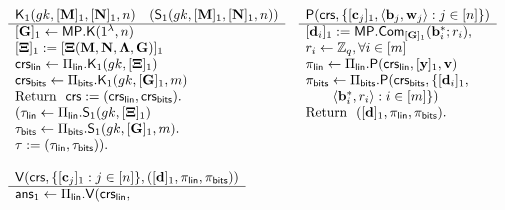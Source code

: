 \begin{figure}
\begin{\algSize}
$$
\begin{array}{ll}
\begin{array}{l}
\algK_1(\gk,[\matr{M}]_1,[\matr{N}]_1,n)
\quad (\mathsf{S}_1(\gk,[\matr{M}]_1,[\matr{N}]_1,n))
\\
\hline
[\matr{G}]_1 \gets \MP.\algK(1^\lambda,n)\\
{[\matr{\Xi}]_1 := [\matr{\Xi}(\matr{M},\matr{N},\matr{\Lambda},\matr{G})]_1}\\
\crs_\sflin\gets\Pi_\sflin.\algK_1(\gk,[\matr{\Xi}]_1)\\
\crs_\sfbits\gets\Pi_\sfbits.\algK_1(\gk,[\matr{G}]_1,\lb)\\
\text{Return } \ \crs:=(\crs_\sflin,\crs_\sfbits).\\
(\tau_\sflin\gets\Pi_\sflin.\algS_1(\gk,[\matr{\Xi}]_1)\\
\tau_\sfbits\gets\Pi_\sfbits.\algS_1(\gk,[\matr{G}]_1,\lb).\\
\tau := (\tau_\sflin,\tau_\sfbits)).\\
\\
\end{array}
&
\begin{array}{l}
{\algP(\mathsf{crs}, \{[\vecb{c}_j]_1,\langle \vecb{b}_j,\vecb{w}_j\rangle:j\in[n]\})}\\
\hline
{[\vecb{d}_i]_1} := \MP.\Com_{[\matr{G}]_1}(\vecb{b}_i^*;r_i),\\
r_i \gets\Z_q, \forall i\in[\lb]\\
\pi_\sflin \gets 
    \Pi_\sflin.\algP
    (
        \crs_\sflin,
            [\vecb{y}]_1,
            \vecb{v}
    )\\
\pi_\sfbits \gets
    \Pi_\sfbits.\algP
    (
        \crs_\sfbits,
        \{[\matr{d}_i]_1,\\
\qquad
        \langle\matr{b}^*_i,r_i\rangle:i \in[\lb]\}
    )\\
\text{Return } \  ([\vecb{d}]_1,\pi_\sflin,\pi_\sfbits). \\
\\
\\
\\
\end{array}\\
\begin{array}{l}
{\algV(\mathsf{crs},\{[\vecb{c}_j]_1:j\in[n]\},([\vecb{d}]_1,\pi_\sflin,\pi_\sfbits))}\\
\hline
\mathsf{ans}_1 \gets
    \Pi_\sflin.\algV
    (
        \crs_\sflin,

\end{array}
\end{array}$$
\end{\algSize}
\end{figure}
